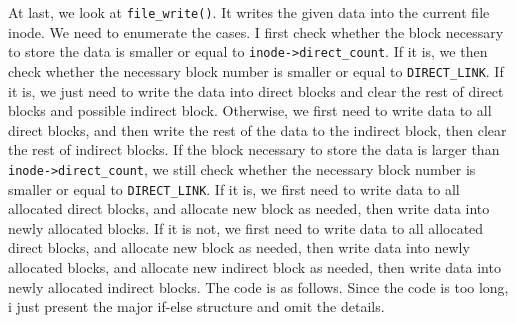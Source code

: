 At last, we look at \texttt{file\_write()}. It writes the given data into the current file inode. 
We need to enumerate the cases. I first check whether the block necessary to store the data is smaller or equal to \texttt{inode->direct\_count}. If it is, we then check whether the necessary block number is smaller or equal to \texttt{DIRECT\_LINK}. 
If it is, we just need to write the data into direct blocks and clear the rest of direct blocks and possible indirect block. Otherwise, 
we first need to write data to all direct blocks, and then write the rest of the data to the indirect block, then clear the rest of indirect blocks.
If the block necessary to store the data is larger than \texttt{inode->direct\_count}, we still check whether the necessary block number is smaller or equal to \texttt{DIRECT\_LINK}.
If it is, we first need to write data to all allocated direct blocks, and allocate new block as needed, then write data into newly allocated blocks.
If it is not, we first need to write data to all allocated direct blocks, and allocate new block as needed, then write data into newly allocated blocks, and allocate new indirect block as needed, then write data into newly allocated indirect blocks. The code is as follows.
Since the code is too long, i just present the major if-else structure and omit the details.

